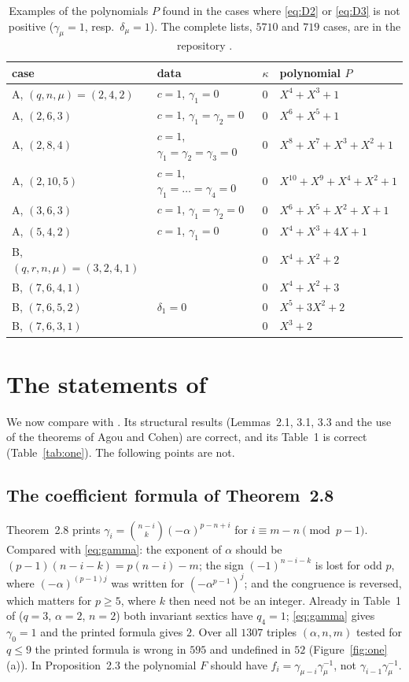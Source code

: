 \documentclass[11pt,a4paper]{amsart}
\theoremstyle{remark}
\begin{document}
\begin{table}[t]
\centering\small
\begin{tabular}{llll}
\toprule
case & data & $\kappa$ & polynomial $P$\\
\midrule
A, $(q,n,\mu)=(2,4,2)$ & $c=1$, $\gamma_1=0$ & $0$ & $X^4+X^3+1$\\
A, $(2,6,3)$ & $c=1$, $\gamma_1=\gamma_2=0$ & $0$ & $X^6+X^5+1$\\
A, $(2,8,4)$ & $c=1$, $\gamma_1=\gamma_2=\gamma_3=0$ & $0$ & $X^8+X^7+X^3+X^2+1$\\
A, $(2,10,5)$ & $c=1$, $\gamma_1=\dots=\gamma_4=0$ & $0$ & $X^{10}+X^9+X^4+X^2+1$\\
A, $(3,6,3)$ & $c=1$, $\gamma_1=\gamma_2=0$ & $0$ & $X^6+X^5+X^2+X+1$\\
A, $(5,4,2)$ & $c=1$, $\gamma_1=0$ & $0$ & $X^4+X^3+4X+1$\\
B, $(q,r,n,\mu)=(3,2,4,1)$ & & $0$ & $X^4+X^2+2$\\
B, $(7,6,4,1)$ & & $0$ & $X^4+X^2+3$\\
B, $(7,6,5,2)$ & $\delta_1=0$ & $0$ & $X^5+3X^2+2$\\
B, $(7,6,3,1)$ & & $0$ & $X^3+2$\\
\bottomrule
\end{tabular}
\caption{Examples of the polynomials $P$ found in the cases where \eqref{eq:D2} or \eqref{eq:D3} is not
positive ($\gamma_\mu=1$, resp.\ $\delta_\mu=1$). The complete lists, $5710$ and $719$ cases, are in the
repository \cite{Repo}.}\label{tab:wit}
\end{table}

\section{The statements of \texorpdfstring{\cite{K}}{[K]}}\label{sec:K}

We now compare with \cite{K}. Its structural results (Lemmas~2.1, 3.1, 3.3 and the use of the theorems of Agou
and Cohen) are correct, and its Table~1 is correct (Table~\ref{tab:one}). The following points are not.

\subsection{The coefficient formula of Theorem~2.8}
Theorem~2.8 prints $\gamma_i=\binom{n-i}{k}(-\alpha)^{p-n+i}$ for $i\equiv m-n\pmod{p-1}$. Compared with
\eqref{eq:gamma}: the exponent of $\alpha$ should be $(p-1)(n-i-k)=p(n-i)-m$; the sign $(-1)^{n-i-k}$ is lost for
odd $p$, where $(-\alpha)^{(p-1)j}$ was written for $(-\alpha^{p-1})^{j}$; and the congruence is reversed, which
matters for $p\ge5$, where $k$ then need not be an integer. Already in Table~1 of \cite{K} ($q=3$, $\alpha=2$,
$n=2$) both invariant sextics have $q_4=1$; \eqref{eq:gamma} gives $\gamma_0=1$ and the printed formula gives
$2$. Over all $1307$ triples $(\alpha,n,m)$ tested for $q\le9$ the printed formula is wrong in $595$ and
undefined in $52$ (Figure~\ref{fig:one}(a)). In Proposition~2.3 the polynomial $F$ should have
$f_i=\gamma_{\mu-i}\gamma_\mu^{-1}$, not $\gamma_{i-1}\gamma_\mu^{-1}$.
\end{document}

